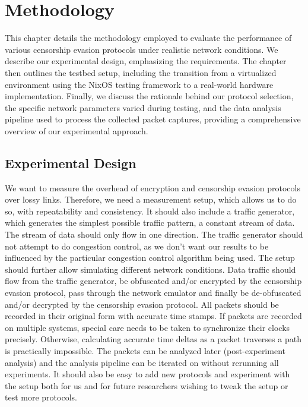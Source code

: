 
\chapter{Methodology}
\label{chap:methodology}

This chapter details the methodology employed to evaluate the performance of various censorship evasion protocols under realistic network conditions.
We describe our experimental design, emphasizing the requirements.
The chapter then outlines the testbed setup, including the transition from a virtualized environment using the NixOS testing framework to a real-world hardware implementation.
Finally, we discuss the rationale behind our protocol selection, the specific network parameters varied during testing, and the data analysis pipeline used to process the collected packet captures, providing a comprehensive overview of our experimental approach.

\section{Experimental Design}
We want to measure the overhead of encryption and censorship evasion protocols over lossy links.
Therefore, we need a measurement setup, which allows us to do so, with repeatability and consistency.
It should also include a traffic generator, which generates the simplest possible traffic pattern, a constant stream of data.
The stream of data should only flow in one direction.
The traffic generator should not attempt to do congestion control, as we don't want our results to be influenced by the particular congestion control algorithm being used.
The setup should further allow simulating different network conditions.
Data traffic should flow from the traffic generator, be obfuscated and/or encrypted by the censorship evasion protocol, pass through the network emulator and finally be de-obfuscated and/or decrypted by the censorship evasion protocol.
All packets should be recorded in their original form with accurate time stamps.
If packets are recorded on multiple systems, special care needs to be taken to synchronize their clocks precisely.
Otherwise, calculating accurate time deltas as a packet traverses a path is practically impossible.
The packets can be analyzed later (post-experiment analysis) and the analysis pipeline can be iterated on without rerunning all experiments.
It should also be easy to add new protocols and experiment with the setup both for us and for future researchers wishing to tweak the setup or test more protocols.

